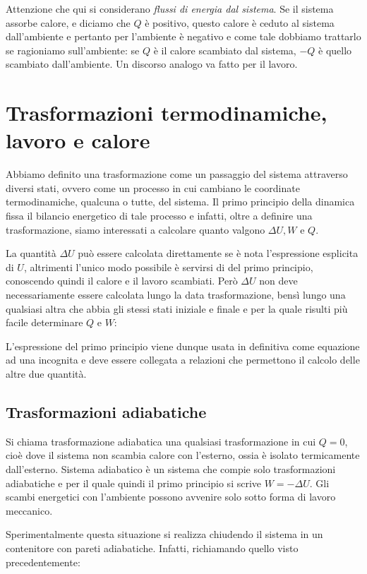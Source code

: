 \documentclass[class=book, crop=false, oneside, 12pt]{standalone}
\begin{document}
Attenzione che qui si considerano \emph{flussi di energia dal sistema}. 
Se il sistema assorbe calore, e diciamo che \(Q\) è positivo, questo calore è ceduto al sistema dall'ambiente e pertanto per l'ambiente è negativo e come tale dobbiamo trattarlo se ragioniamo sull'ambiente: se \(Q\) è il calore scambiato dal sistema, \(-Q\) è  quello scambiato dall'ambiente. 
Un discorso analogo va fatto per il lavoro.

\section{Trasformazioni termodinamiche, lavoro e calore}

Abbiamo definito una trasformazione come un passaggio del sistema attraverso diversi stati, ovvero come un processo in cui cambiano le coordinate termodinamiche, qualcuna o tutte, del sistema.
Il primo principio della dinamica fissa il bilancio energetico di tale processo e infatti, oltre a definire una trasformazione, siamo interessati a calcolare quanto valgono \(\Delta U, W\) e \(Q\). 

La quantità \(\Delta U\) può essere calcolata direttamente se è nota l'espressione esplicita di \(U\), altrimenti l'unico modo possibile è servirsi di del primo principio, conoscendo quindi il calore e il lavoro scambiati. 
Però \(\Delta U\) non deve necessariamente essere calcolata lungo la data trasformazione, bensì lungo una qualsiasi altra che abbia gli stessi stati iniziale e finale e per la quale risulti più facile determinare \(Q\) e \(W\): 

L'espressione del primo principio viene dunque usata in definitiva come equazione ad una incognita e deve essere collegata a relazioni che permettono il calcolo delle altre due quantità.

\subsection{Trasformazioni adiabatiche}

Si chiama trasformazione adiabatica una qualsiasi trasformazione in cui \(Q = 0\), cioè dove il sistema non scambia calore con l'esterno, ossia è isolato termicamente dall'esterno.
Sistema adiabatico è un sistema che compie solo trasformazioni adiabatiche e per il quale quindi il primo principio si scrive \(W = - \Delta U\).
Gli scambi energetici con l'ambiente possono avvenire solo sotto forma di lavoro meccanico. 

Sperimentalmente questa situazione si realizza chiudendo il sistema in un contenitore con pareti adiabatiche. 
Infatti, richiamando quello visto precedentemente:
\end{document}
